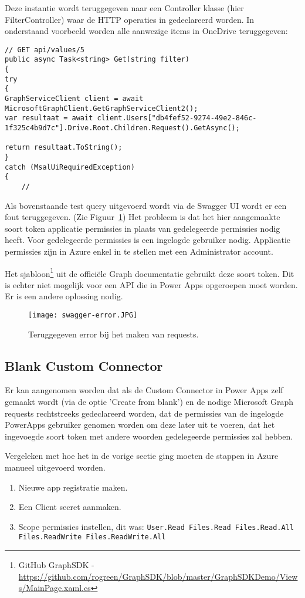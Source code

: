 Deze instantie wordt teruggegeven naar een Controller klasse (hier FilterController) waar de HTTP operaties in gedeclareerd worden. In onderstaand voorbeeld worden alle aanwezige items in OneDrive teruggegeven:
\begin{lstlisting}[style=CSharpStyle]
// GET api/values/5
public async Task<string> Get(string filter)
{
try
{
GraphServiceClient client = await MicrosoftGraphClient.GetGraphServiceClient2();
var resultaat = await client.Users["db4fef52-9274-49e2-846c-1f325c4b9d7c"].Drive.Root.Children.Request().GetAsync();

return resultaat.ToString();
}
catch (MsalUiRequiredException)
{
    //
\end{lstlisting}

Als bovenstaande test query uitgevoerd wordt via de Swagger UI wordt er een fout teruggegeven. (Zie Figuur~\ref{fig:swagger-error})
Het probleem is dat het hier aangemaakte soort token applicatie permissies in plaats van gedelegeerde permissies nodig heeft. Voor gedelegeerde permissies is een ingelogde gebruiker nodig. Applicatie permissies zijn in Azure enkel in te stellen met een Administrator account.

Het sjabloon\footnote{GitHub GraphSDK - \url{https://github.com/rogreen/GraphSDK/blob/master/GraphSDKDemo/Views/MainPage.xaml.cs}} uit de officiële Graph documentatie gebruikt deze soort token.\autocite{MicrosoftDocs2020d} Dit is echter niet mogelijk voor een API die in Power Apps opgeroepen moet worden. Er is een andere oplossing nodig.

\begin{figure}[h!]
    \texttt{[image: swagger-error.JPG]}
    \caption{Teruggegeven error bij het maken van requests.}
    \label{fig:swagger-error}
\end{figure}

\subsection{Blank Custom Connector}

Er kan aangenomen worden dat als de Custom Connector in Power Apps zelf gemaakt wordt (via de optie 'Create from blank') en de nodige Microsoft Graph requests rechtstreeks gedeclareerd worden, dat de permissies van de ingelogde PowerApps gebruiker genomen worden om deze later uit te voeren, dat het ingevoegde soort token met andere woorden gedelegeerde permissies zal hebben.

Vergeleken met hoe het in de vorige sectie ging moeten de stappen in Azure manueel uitgevoerd worden.
\begin{enumerate}
    \item Nieuwe app registratie maken.
    \item Een Client secret aanmaken.
    \item Scope permissies instellen, dit was: \lstinline|User.Read Files.Read Files.Read.All Files.ReadWrite Files.ReadWrite.All|
\end{enumerate}


